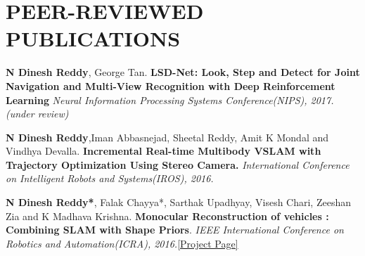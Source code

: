 \documentclass[a4paper,10pt]{article}
\begin{document}
\begin{tabular}{rl}
\end{tabular}

\section{PEER-REVIEWED PUBLICATIONS} 


\vspace{-2 mm}
\textbf{N Dinesh Reddy}, George Tan. \textbf{LSD-Net: Look, Step and Detect for Joint Navigation and Multi-View Recognition with Deep Reinforcement Learning} {\sl Neural Information Processing Systems Conference(NIPS), 2017.(under review)}


\textbf{N Dinesh Reddy},Iman Abbasnejad, Sheetal Reddy,  Amit K Mondal and Vindhya Devalla. \textbf{Incremental Real-time Multibody VSLAM with Trajectory Optimization Using Stereo Camera.} {\sl International Conference on Intelligent Robots and Systems(IROS), 2016.}



\textbf{N Dinesh Reddy*}, Falak Chayya*, Sarthak Upadhyay, Visesh Chari, Zeeshan Zia and K Madhava Krishna. \textbf{Monocular Reconstruction of vehicles : Combining SLAM with Shape Priors}. {\sl IEEE International Conference on Robotics and Automation(ICRA), 2016.}\href{http://robotics.iiit.ac.in/people/falak.chhaya/Monocular_Reconstruction_of_Vehicles.html}{[Project Page]}
\end{document}
